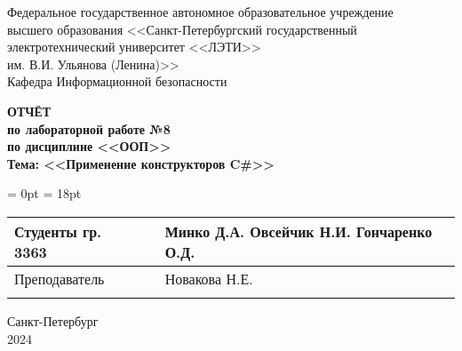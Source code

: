  \thispagestyle{empty}

\begin{center}
	Федеральное государственное автономное образовательное учреждение \\
	высшего образования <<Санкт-Петербургский государственный \\ 
	электротехнический университет <<ЛЭТИ>> \\
	им. В.И. Ульянова (Ленина)>>\\
	Кафедра Информационной безопасности\\
\end{center}

\vfill

\begin{center}
	
	{\bfseries ОТЧЁТ \\
	по лабораторной работе №8 \\
	по дисциплине <<ООП>>\\
	Тема: <<Применение конструкторов C\#>>}
\end{center}

\vfill

\begin{table}[H]
	\tabcolsep = 0pt
	\extrarowheight = 18pt
	\begin{tabularx}{\textwidth}{>{\raggedright\arraybackslash}b{6.3cm}>{\raggedright\arraybackslash}b{4.6cm}>{\centering\arraybackslash}X}
		Студенты гр. 3363&&Минко Д.А. Овсейчик Н.И. Гончаренко О.Д.\\ \cline{2-2}
		Преподаватель&&Новакова Н.Е.\\ \cline{2-2}
	\end{tabularx}
\end{table}

\begin{center}
	Санкт-Петербург \\ 2024
\end{center}
